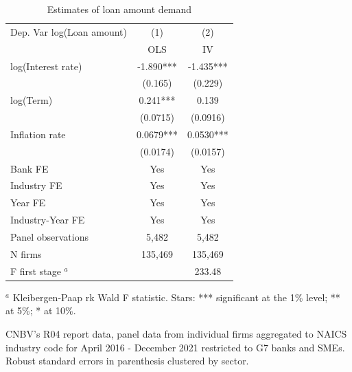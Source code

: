 \documentclass[11pt, oneside]{book}
\newcommand{\sym}[1]{#1}
\begin{document}
\begin{table}[htbp]\centering
  \begin{threeparttable}
\center
\caption{Estimates of loan amount demand}
\label{tab:small}
\begin{tabular}{@{}lcc@{}}
\toprule
Dep. Var log(Loan amount) & (1)     & (2)   \\ 
		                & OLS  & IV  \\ 
\midrule
log(Interest rate)&   -1.890\sym{***}&   -1.435\sym{***}\\
                &  (0.165)         &  (0.229)         \\
log(Term)       &    0.241\sym{***}&    0.139         \\
                & (0.0715)         & (0.0916)         \\
Inflation rate  &   0.0679\sym{***}&   0.0530\sym{***}\\
                & (0.0174)         & (0.0157)         \\

Bank FE&      Yes         &      Yes         \\
Industry FE &      Yes         &      Yes         \\
Year FE    &      Yes         &      Yes         \\
Industry-Year FE &      Yes         &      Yes         \\
\midrule
Panel observations    &      5,482   &      5,482          \\
N firms &       135,469  &       135,469        \\
\midrule
F first stage $^a$  & &   233.48                \\
\bottomrule
\end{tabular}
\begin{tablenotes}[flushleft]
	\item $^a$ Kleibergen-Paap rk Wald F statistic. Stars: *** significant at the 1\% level; ** at 5\%; * at 10\%. 
	\item CNBV's R04 report data, panel data from individual firms aggregated to NAICS industry code for April 2016 - December 2021 restricted to G7 banks and SMEs. Robust standard errors in parenthesis clustered by sector.
    
    \end{tablenotes}
  \end{threeparttable}
\end{table}
\end{document}
